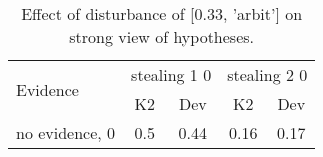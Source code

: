 \begin{table}\begin{tabular}{l|cc|cc}\toprule\multirow{2}{*}{Evidence} & \multicolumn{2}{c}{stealing 1 0}& \multicolumn{2}{c}{stealing 2 0}\\& {K2} & {Dev}& {K2} & {Dev}\\\midrule
no evidence, 0 & \cellcolor{Bittersweet}0.5&\cellcolor{Bittersweet}0.44&0.16&0.17\\\bottomrule\end{tabular}\caption{Effect of disturbance of [0.33, 'arbit'] on strong view of hypotheses.}\end{table}